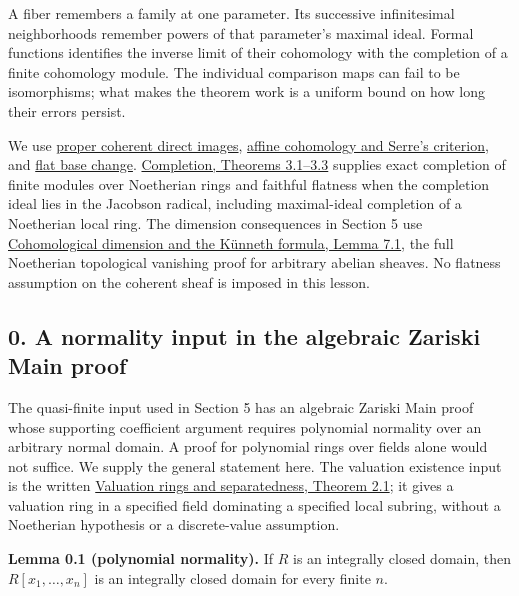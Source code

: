 \documentclass[11pt]{article}
\begin{document}
A fiber remembers a family at one parameter. Its successive
infinitesimal neighborhoods remember powers of that parameter's maximal
ideal. Formal functions identifies the inverse limit of their cohomology
with the completion of a finite cohomology module. The individual
comparison maps can fail to be isomorphisms; what makes the theorem work
is a uniform bound on how long their errors persist.

We use \href{proper-morphisms-and-coherent-direct-images.md}{proper
coherent direct images},
\href{affine-cohomology-and-serres-criterion.md}{affine cohomology and
Serre's criterion}, and
\href{base-change-and-the-grothendieck-complex.md}{flat base change}.
\href{../AG-CA/AG-CA-19.html\#3-noetherian-exactness-tensoring-and-flatness}{Completion,
Theorems 3.1--3.3} supplies exact completion of finite modules over
Noetherian rings and faithful flatness when the completion ideal lies in
the Jacobson radical, including maximal-ideal completion of a Noetherian
local ring. The dimension consequences in Section 5 use
\href{../ag-etale-cohomology/cohomological-dimension-and-the-kunneth-formula.html\#7-the-bound-for-all-finite-type-schemes}{Cohomological
dimension and the Künneth formula, Lemma 7.1}, the full Noetherian
topological vanishing proof for arbitrary abelian sheaves. No flatness
assumption on the coherent sheaf is imposed in this lesson.

\subsection{0. A normality input in the algebraic Zariski Main
proof}\label{a-normality-input-in-the-algebraic-zariski-main-proof}

The quasi-finite input used in Section 5 has an algebraic Zariski Main
proof whose supporting coefficient argument requires polynomial
normality over an arbitrary normal domain. A proof for polynomial rings
over fields alone would not suffice. We supply the general statement
here. The valuation existence input is the written
\href{../AG-GS/prerequisites/AG-MO/valuation-rings-and-separatedness.html}{Valuation
rings and separatedness, Theorem 2.1}; it gives a valuation ring in a
specified field dominating a specified local subring, without a
Noetherian hypothesis or a discrete-value assumption.

\textbf{Lemma 0.1 (polynomial normality).} If \(R\) is an integrally
closed domain, then \(R[x_1,\ldots,x_n]\) is an integrally closed domain
for every finite \(n\).
\end{document}
